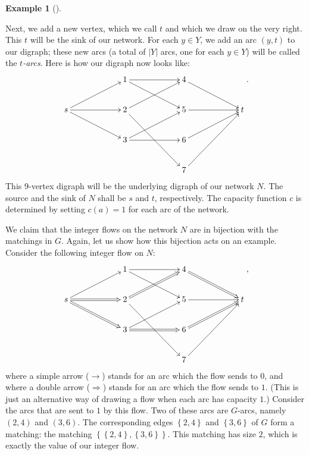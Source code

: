 \documentclass[numbers=enddot,12pt,final,onecolumn,notitlepage]{scrartcl}%
\theoremstyle{definition}
\newtheorem{exam}[theo]{Example}
\newenvironment{example}[1][]
{\begin{exam}[#1]\begin{leftbar}}
{\end{leftbar}\end{exam}}
\begin{document}
\begin{example}
Next, we add a new vertex, which we call $t$ and which we draw on the very
right. This $t$ will be the sink of our network. For each $y\in Y$, we add an
arc $\left(  y,t\right)  $ to our digraph; these new arcs (a total of
$\left\vert Y\right\vert $ arcs, one for each $y\in Y$) will be called the
$t$\textit{-arcs}. Here is how our digraph now looks like:%
\[%
\xymatrix@C=5pc{
& 1 \ar[r] \ar[rd] & 4 \ar[rd] \\
s \ar[ru] \ar[r] \ar[rd] & 2 \ar[ru] \ar[rdd] & 5 \ar[r] & t \\
& 3 \ar[ru] \ar[r] & 6 \ar[ru] \\
& & 7 \ar[ruu]
}%
.
\]
This $9$-vertex digraph will be the underlying digraph of our network $N$. The
source and the sink of $N$ shall be $s$ and $t$, respectively. The capacity
function $c$ is determined by setting $c\left(  a\right)  =1$ for each arc of
the network.

We claim that the integer flows on the network $N$ are in bijection with the
matchings in $G$. Again, let us show how this bijection acts on an example.
Consider the following integer flow on $N$:%
\begin{equation}%
\xymatrix@C=5pc{
& 1 \ar[r] \ar[rd] & 4 \ar@{=>}[rd] \\
s \ar[ru] \ar@{=>}[r] \ar@{=>}[rd] & 2 \ar@{=>}[ru] \ar[rdd] & 5 \ar[r] & t \\
& 3 \ar[ru] \ar@{=>}[r] & 6 \ar@{=>}[ru] \\
& & 7 \ar[ruu]
}%
, \label{eq.exam.hall.bij1}%
\end{equation}
where a simple arrow ($\longrightarrow$) stands for an arc which the flow
sends to $0$, and where a double arrow ($\Longrightarrow$) stands for an arc
which the flow sends to $1$. (This is just an alternative way of drawing a
flow when each arc has capacity $1$.) Consider the arcs that are sent to $1$
by this flow. Two of these arcs are $G$-arcs, namely $\left(  2,4\right)  $
and $\left(  3,6\right)  $. The corresponding edges $\left\{  2,4\right\}  $
and $\left\{  3,6\right\}  $ of $G$ form a matching: the matching $\left\{
\left\{  2,4\right\}  ,\left\{  3,6\right\}  \right\}  $. This matching has
size $2$, which is exactly the value of our integer flow.
\end{example}
\end{document}
